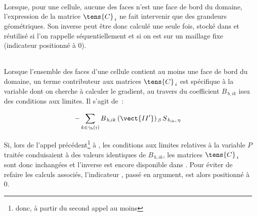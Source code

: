 {\hspace*{2cm}{\bf Cellule ne poss\'edant pas de face de bord }\\
Lorsque, pour une cellule, aucune des faces n'est une face de bord du domaine,
l'expression de la matrice $\tens{C}_{\,i}$ ne fait intervenir que des grandeurs
g\'eom\'etriques. Son inverse peut \^etre donc calcul\'e une seule fois, stock\'e dans
 et r\'eutilis\'e si l'on rappelle  s\'equentiellement et
si on est sur un maillage fixe (indicateur  positionn\'e \`a 0).

\hspace*{2cm}{\bf Cellule poss\'edant au moins une face de bord }\\
Lorsque l'ensemble des faces d'une cellule contient au moins une face de bord
du domaine, un terme contributeur aux matrices  $\tens{C}_{\,i}$ est
sp\'ecifique \`a la variable dont on cherche
\`a calculer le gradient, au travers du coefficient $B_{\,b,ik}$
issu des conditions aux limites. Il s'agit de~:

\begin{equation}\notag
- \displaystyle\sum\limits_{k\in\gamma_b(i)}
B_{\,b,ik}\,(\vect{II'})_{\,\beta} \,S_{\,{b}_{ik},\,\eta}
\end{equation}

Si, lors de l'appel pr\'ec\'edent\footnote{donc, \`a partir du second appel au
moins}  \`a ,
les conditions aux limites relatives \`a la
variable $P$ trait\'ee conduisaient \`a des valeurs identiques de $B_{\,b,ik}$, les
matrices $\tens{C}_{\,i}$ sont donc inchang\'ees et l'inverse  est encore
disponible  dans . Pour \'eviter de refaire les calculs associ\'es,
l'indicateur , pass\'e en argument, est alors positionn\'e \`a 0.

}

